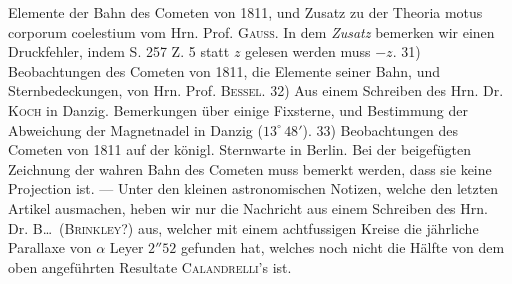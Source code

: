 Elemente der Bahn des Cometen von 1811, und Zusatz zu der Theoria motus corporum coelestium vom Hrn. Prof. \textsc{Gauss}. In dem \emph{Zusatz} bemerken wir einen Druckfehler, indem S. 257 Z. 5 statt $z$ gelesen werden muss $-z$. 31) Beobachtungen des Cometen von 1811, die Elemente seiner Bahn, und Sternbedeckungen, von Hrn. Prof. \textsc{Bessel}. 32) Aus einem Schreiben des Hrn. Dr. \textsc{Koch} in Danzig. Bemerkungen über einige Fixsterne, und Bestimmung der Abweichung der Magnetnadel in Danzig ($13^\circ\,48'$). 33) Beobachtungen des Cometen von 1811 auf der königl. Sternwarte in Berlin. Bei der beigefügten Zeichnung der wahren Bahn des Cometen muss bemerkt werden, dass sie keine Projection ist. --- Unter den kleinen astronomischen Notizen, welche den letzten Artikel ausmachen, heben wir nur die Nachricht aus einem Schreiben des Hrn. Dr. B\dots\ (\textsc{Brinkley}?) aus, welcher mit einem achtfussigen Kreise die jährliche Parallaxe von $\alpha$ Leyer $2''52$ gefunden hat, welches noch nicht die Hälfte von dem oben angeführten Resultate \textsc{Calandrelli}'s ist.

